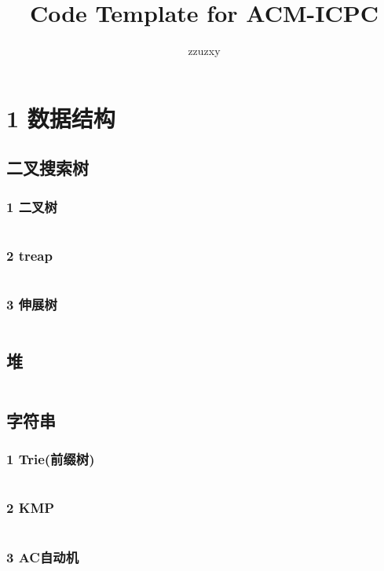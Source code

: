 \documentclass{article}
\title{Code Template for ACM-ICPC}
\author{zzuzxy}
\begin{document}
\begin{titlepage}
\maketitle
\thispagestyle{empty}
\pagebreak
\pagestyle{plain}
\tableofcontents
\end{titlepage}
\section{1 数据结构}
\subsection{二叉搜索树}
\subsubsection{1 二叉树}
\inputminted{c++}{/home/zzuzxy/t3/ACM-template/1 数据结构/二叉搜索树/1 二叉树.cpp}
\subsubsection{2 treap}
\inputminted{c++}{/home/zzuzxy/t3/ACM-template/1 数据结构/二叉搜索树/2 treap.cpp}
\subsubsection{3 伸展树}
\inputminted{c++}{/home/zzuzxy/t3/ACM-template/1 数据结构/二叉搜索树/3 伸展树.cpp}
\subsection{堆}
\inputminted{c++}{/home/zzuzxy/t3/ACM-template/1 数据结构/基础数据结构/堆.cpp}
\subsection{字符串}
\subsubsection{1 Trie(前缀树)}
\inputminted{c++}{/home/zzuzxy/t3/ACM-template/1 数据结构/字符串/1 Trie(前缀树).cpp}
\subsubsection{2 KMP}
\inputminted{c++}{/home/zzuzxy/t3/ACM-template/1 数据结构/字符串/2 KMP.cpp}
\subsubsection{3 AC自动机}
\inputminted{c++}{/home/zzuzxy/t3/ACM-template/1 数据结构/字符串/3 AC自动机.cpp}
\end{document}
